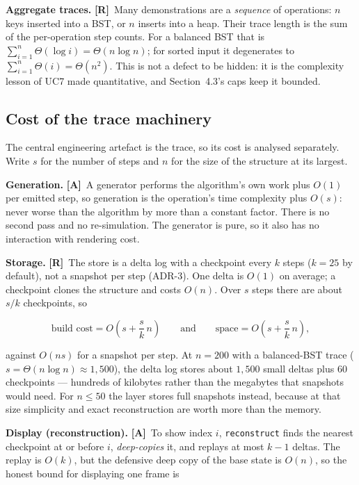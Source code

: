 \documentclass[11pt,a4paper]{article}
\newcommand{\R}{\textcolor{reqc}{\textbf{[R]}}}     %
\newcommand{\A}{\textcolor{asmc}{\textbf{[A]}}}     %
\newcommand{\ct}[1]{\texttt{#1}}
\begin{document}
\noindent\textbf{Aggregate traces.} \R\ Many demonstrations are a \emph{sequence} of
operations: $n$ keys inserted into a BST, or $n$ inserts into a heap. Their trace length is
the sum of the per-operation step counts. For a balanced BST that is
$\sum_{i=1}^{n} \Theta(\log i) = \Theta(n \log n)$; for sorted input it degenerates to
$\sum_{i=1}^{n} \Theta(i) = \Theta(n^2)$. This is not a defect to be hidden: it is the
complexity lesson of UC7 made quantitative, and Section~4.3's caps keep it bounded.

\subsection{Cost of the trace machinery}

The central engineering artefact is the trace, so its cost is analysed separately. Write $s$
for the number of steps and $n$ for the size of the structure at its largest.

\smallskip
\noindent\textbf{Generation.} \A\ A generator performs the algorithm's own work plus $O(1)$
per emitted step, so generation is the operation's time complexity plus $O(s)$: never worse
than the algorithm by more than a constant factor. There is no second pass and no
re-simulation. The generator is pure, so it also has no interaction with rendering cost.

\smallskip
\noindent\textbf{Storage.} \R\ The store is a delta log with a checkpoint every $k$ steps
($k = 25$ by default), not a snapshot per step (ADR-3). One delta is $O(1)$ on average; a
checkpoint clones the structure and costs $O(n)$. Over $s$ steps there are about $s/k$
checkpoints, so

\[
\text{build cost} = O\!\left(s + \frac{s}{k}\,n\right)
\qquad\text{and}\qquad
\text{space} = O\!\left(s + \frac{s}{k}\,n\right),
\]

against $O(ns)$ for a snapshot per step. At $n = 200$ with a balanced-BST trace
($s = \Theta(n \log n) \approx 1{,}500$), the delta log stores about $1{,}500$ small deltas
plus $60$ checkpoints --- hundreds of kilobytes rather than the megabytes that snapshots
would need. For $n \le 50$ the layer stores full snapshots instead, because at that size
simplicity and exact reconstruction are worth more than the memory.

\smallskip
\noindent\textbf{Display (reconstruction).} \A\ To show index $i$, \ct{reconstruct} finds the
nearest checkpoint at or before $i$, \emph{deep-copies} it, and replays at most $k-1$ deltas.
The replay is $O(k)$, but the defensive deep copy of the base state is $O(n)$, so the honest
bound for displaying one frame is
\end{document}
